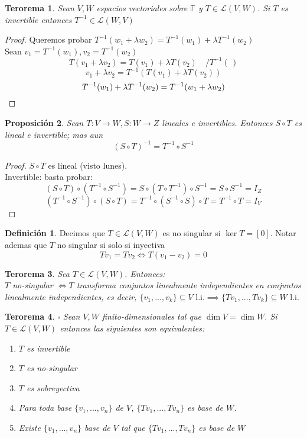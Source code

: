 \documentclass[11pt]{book}
\newtheorem{thm}{Terorema}[section]
\newtheorem{prop}[thm]{Proposición}
\theoremstyle{definition}
\newtheorem{defn}{Definición}[section]
\begin{document}
\begin{thm}
Sean $V,W$ espacios vectoriales sobre $\mathbb{F}$ y $T\in\mathcal{L}(V,W)$. Si $T$ es invertible entonces $T^{-1}\in\mathcal{L}(W,V)$
\end{thm}
\begin{proof}
Queremos probar $T^{-1}(w_1+\lambda w_2)=T^{-1}(w_1)+\lambda T^{-1}(w_2)$\\
Sean $v_1=T^{-1}(w_1),v_2=T^{-1}(w_2)$
\[
T(v_1+\lambda v_2)=T(v_1)+\lambda T(v_2)\quad /T^{-1}(\,)
\]
\[
v_1+\lambda v_2=T^{-1}(T(v_1)+\lambda T(v_2))
\]
\begin{equation}
T^{-1}(w_1)+\lambda T^{-1}(w_2)=T^{-1}(w_1+\lambda w_2)\qedhere
\end{equation}
\end{proof}
\begin{prop}
Sean $T:V\rightarrow W,S:W\rightarrow Z$ lineales e invertibles. Entonces $S\circ T$ es lineal e invertible; mas aun
\begin{equation}
(S\circ T)^{-1}=T^{-1}\circ S^{-1}
\end{equation}
\end{prop}
\begin{proof}
$S\circ T$ es lineal (visto lunes).\\
Invertible: basta probar:
\[
(S\circ T)\circ(T^{-1}\circ S^{-1})=S\circ (T\circ T^{-1})\circ S^{-1}=S\circ S^{-1}=I_Z
\]
\[
(T^{-1}\circ S^{-1})\circ (S\circ T)=T^{-1}\circ (S^{-1}\circ S)\circ T=T^{-1}\circ T=I_V
\]
\end{proof}
\begin{defn}
Decimos que $T\in\mathcal{L}(V,W)$ es no singular si $\ker T=[0]$. Notar ademas que $T$ no singular si solo si inyectiva
\begin{equation}
Tv_1=Tv_2\iff T(v_1-v_2)=0
\end{equation}
\end{defn}
\begin{thm}
Sea $T\in\mathcal{L}(V,W)$. Entonces:\\

$T$ no-singular $\iff T$ transforma conjuntos linealmente independientes en conjuntos linealmente independientes, es decir, $\{v_1,...,v_k\}\subseteq V\textrm{ l.i.}\implies\{Tv_1,...,Tv_k\}\subseteq W\textrm{ l.i.}$

\end{thm}
\begin{thm}{$\square$ }
Sean $V,W$ finito-dimensionales tal que $\dim V=\dim W$. Si $T\in\mathcal{L}(V,W)$ entonces las siguientes son equivalentes:
\begin{enumerate}[label=\roman*)]
	\item $T$ es invertible
	
	\item $T$ es no-singular
	
	\item $T$ es sobreyectiva
	
	\item Para toda base $\{v_1,...,v_n\}$ de $V$, $\{Tv_1,...,Tv_n\}$ es base de $W$.
	
	\item Existe $\{v_1,...,v_n\}$ base de $V$ tal que $\{Tv_1,...,Tv_n\}$ es base de $W$
\end{enumerate}
\end{thm}
\end{document}

